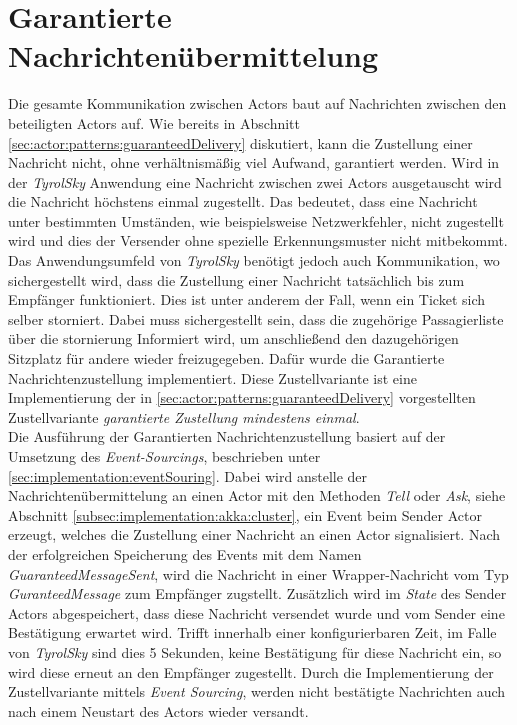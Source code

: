\section{Garantierte Nachrichtenübermittelung}
Die gesamte Kommunikation zwischen Actors baut auf Nachrichten zwischen den beteiligten Actors auf. Wie bereits in Abschnitt \ref{sec:actor:patterns:guaranteedDelivery} diskutiert, kann die Zustellung einer Nachricht nicht, ohne verhältnismäßig viel Aufwand, garantiert werden. Wird in der \textit{TyrolSky} Anwendung eine Nachricht zwischen zwei Actors ausgetauscht wird die Nachricht höchstens einmal zugestellt. Das bedeutet, dass eine Nachricht unter bestimmten Umständen, wie beispielsweise Netzwerkfehler, nicht zugestellt wird und dies der Versender ohne spezielle Erkennungsmuster nicht mitbekommt. \\
Das Anwendungsumfeld von \textit{TyrolSky} benötigt jedoch auch Kommunikation, wo sichergestellt wird, dass die Zustellung einer Nachricht tatsächlich bis zum Empfänger funktioniert. Dies ist unter anderem der Fall, wenn ein Ticket sich selber storniert. Dabei muss sichergestellt sein, dass die zugehörige Passagierliste über die stornierung Informiert wird, um anschließend den dazugehörigen Sitzplatz für andere wieder freizugegeben. Dafür wurde die Garantierte Nachrichtenzustellung implementiert. Diese Zustellvariante ist eine Implementierung der in \ref{sec:actor:patterns:guaranteedDelivery} vorgestellten Zustellvariante \textit{garantierte Zustellung mindestens einmal}. \\
Die Ausführung der Garantierten Nachrichtenzustellung basiert auf der Umsetzung des \textit{Event-Sourcings}, beschrieben unter \ref{sec:implementation:eventSouring}. Dabei wird anstelle der Nachrichtenübermittelung an einen Actor mit den Methoden \textit{Tell} oder \textit{Ask}, siehe Abschnitt \ref{subsec:implementation:akka:cluster}, ein Event beim Sender Actor erzeugt, welches die Zustellung einer Nachricht an einen Actor signalisiert. Nach der erfolgreichen Speicherung des Events mit dem Namen \textit{GuaranteedMessageSent}, wird die Nachricht in einer Wrapper-Nachricht vom Typ \textit{GuranteedMessage} zum Empfänger zugstellt. Zusätzlich wird im \textit{State} des Sender Actors abgespeichert, dass diese Nachricht versendet wurde und vom Sender eine Bestätigung erwartet wird. Trifft innerhalb einer konfigurierbaren Zeit, im Falle von \textit{TyrolSky} sind dies 5 Sekunden, keine Bestätigung für diese Nachricht ein, so wird diese erneut an den Empfänger zugestellt. Durch die Implementierung der Zustellvariante mittels \textit{Event Sourcing}, werden nicht bestätigte Nachrichten auch nach einem Neustart des Actors wieder versandt. \\
